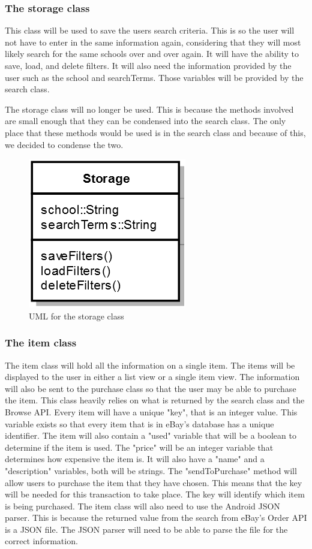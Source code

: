 \documentclass[journal,compsoc, 10pt, draftclsnofoot, onecolumn]{IEEEtran}
\begin{document}
\subsubsection*{The storage class}
This class will be used to save the users search criteria. This is so the user 
will not have to enter in the same information again, considering that they 
will most likely search for the same schools over and over again. It will have 
the ability to save, load, and delete filters. It will also need the information 
provided by the user such as the school and searchTerms. Those variables will be 
provided by the search class. \newline

The storage class will no longer be used. This is because the methods involved are 
small enough that they can be condensed into the search class. The only place 
that these methods would be used is in the search class and because of this, we 
decided to condense the two. 

\begin{figure}[h]
\centering
\caption{UML for the storage class}
\includegraphics[scale=.9]{storageUML}
\end{figure}
\FloatBarrier

\subsubsection*{The item class}
The item class will hold all the information on a single item. The items will be 
displayed to the user in either a list view or a single item view. The information 
will also be sent to the purchase class so that the user may be able to purchase 
the item. This class heavily relies on what is returned by the search class and 
the Browse API. Every item will have a unique "key", that is an integer value. This 
variable exists so that every item that is in eBay's database has a unique 
identifier. The item will also contain a "used" variable that will be a boolean 
to determine if the item is used. The "price" will be an integer variable that 
determines how expensive the item is. It will also have a "name" and a 
"description" variables,  both will be strings. The "sendToPurchase" method will 
allow users to purchase the item that they have chosen. This means that the key 
will be needed for this transaction to take place. The key will identify which 
item is being purchased. The item class will also need to use the Android JSON 
parser. This is because the returned value from the search from eBay's Order 
API is a JSON file. The JSON parser will need to be able to parse the file for the
correct information.
\end{document}
